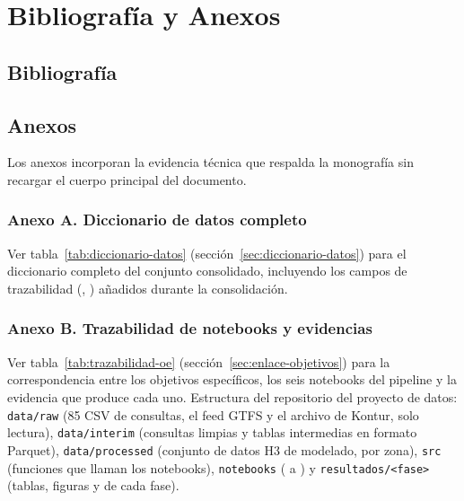 \chapter{Bibliografía y Anexos}
\label{cap:bibliografia}

\section{Bibliografía}
\label{sec:bibliografia}

\printbibliography[heading=none]

\clearpage
\section{Anexos}
\label{sec:anexos}

Los anexos incorporan la evidencia técnica que respalda la monografía sin recargar el
cuerpo principal del documento.

\subsection{Anexo A. Diccionario de datos completo}
\label{anexo:diccionario-datos}

Ver tabla~\ref{tab:diccionario-datos} (sección~\ref{sec:diccionario-datos}) para el
diccionario completo del conjunto consolidado, incluyendo los campos de trazabilidad
(, ) añadidos durante la consolidación.

\subsection{Anexo B. Trazabilidad de notebooks y evidencias}
\label{anexo:trazabilidad-scripts}

Ver tabla~\ref{tab:trazabilidad-oe} (sección~\ref{sec:enlace-objetivos}) para la
correspondencia entre los objetivos específicos, los seis notebooks del pipeline y la
evidencia que produce cada uno. Estructura del repositorio del proyecto de datos:
\texttt{data/raw} (85 CSV de consultas, el feed GTFS y el archivo de Kontur, solo
lectura), \texttt{data/interim} (consultas limpias y tablas intermedias en formato Parquet),
\texttt{data/processed} (conjunto de datos H3 de modelado, por zona), \texttt{src} (funciones que llaman
los notebooks), \texttt{notebooks} ( a ) y
\texttt{resultados/<fase>} (tablas, figuras y  de cada fase).
